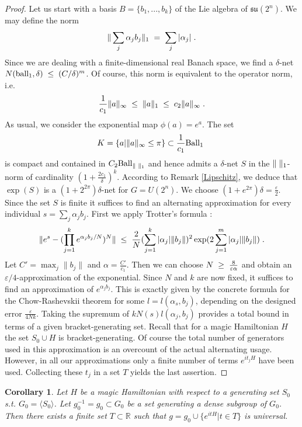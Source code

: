\documentclass[12pt, a4-paper]{amsart}
\numberwithin{equation}{section}
\newcommand{\kl}{\pl \le \pl}
\newcommand{\gl}{\pl \ge \pl}
\newcommand{\lel}{\pl = \pl}
\newcommand{\rz}{{\mathbb R}}
\newcommand{\pl}{\hspace{.1cm}}
\newcommand{\al}{\alpha}
\newcommand{\eps}{\varepsilon}
\newtheorem{cor}[lemma]{Corollary}
\begin{document}
\begin{proof} Let us start with a basis $B=\{b_1,...,b_k\}$ of the Lie algebra of $\mathfrak{su}(2^n)$. We may define the norm 
 \[ \|\sum_j \al_j b_j\|_1  \lel \sum_j |\al_j|  \pl. \]
Since we are dealing with a finite-dimensional real Banach space, we find a $\delta$-net $N({\rm ball}_1,\delta)\kl (C/\delta)^{m}$. Of course, this norm is equivalent to the operator norm, i.e. 
  \[ \frac{1}{c_1} \|a\|_{\infty} \kl \|a\|_1 \kl c_2 \|a\|_{\infty} \pl .\]
As usual, we consider the exponential map $\phi(a)=e^{a}$. The set 
\[ K=\{a| \|a\|_{\infty}\le \pi\}\subset \frac{1}{c_1}{\rm Ball}_1\pl\]
is compact and contained in $C_2{\rm Ball}_{\|\pl\|_1}$ and hence admits a $\delta$-net $S$ in the $\|\pl\|_1$-norm of cardinality $(1+\frac{2c_1}{\delta})^{k}$. According to  Remark  \ref{Lipschitz}, we deduce that $\exp(S)$ is a $(1+2^{2\pi})\delta$-net for $G=U(2^n)$. We choose $(1+e^{2\pi})\delta=\frac{\eps}{2}$. Since the set $S$ is finite it suffices to find an alternating approximation for every individual $s=\sum_j \al_j b_j$. First we apply Trotter's formula \cite{Suzuki1976}:
 \[ \|e^s-(\prod_{j=1}^k e^{\al_j b_j/N})^N\| \kl \frac{2}{N} (\sum_{j=1}^k |\al_j| \|b_j\|)^2 \exp(2 \sum_{j=1}^m |\al_j| \|b_j\|) \pl .\]
Let $C'=\max_j\|b_j\|$ and $\al=\frac{C'}{c_1}$. Then we can choose $N\gl \frac{8}{\eps \al}$ and obtain an $\eps/4$-approximation of  the exponential. Since $N$ and $k$ are now fixed, it suffices to find an approximation of $e^{\al_j b_j}$. This is exactly given by the concrete formula for the Chow-Rashevskii theorem \cite{Giannotti2024ProvingRashevskii} for some $l=l(\al_s,b_j)$, depending on the designed error $\frac{\eps}{4Nk}$. Taking the supremum of $kN(s)l(\al_j,b_j)$ provides a total bound in terms of a given bracket-generating set. 
Recall that for a magic Hamiltonian $H$ the set $S_0\cup H$ is bracket-generating. Of course the total number of generators used in this approximation is an overcount of the actual alternating usage. However, in all our approximations only a finite number of terms $e^{it_jH}$ have been used. Collecting these $t_j$ in a set $T$ yields the last assertion. \end{proof}
 
\begin{cor} Let $H$ be a magic Hamiltonian with respect to a generating set $S_0$ s.t. $G_0 = \langle S_0 \rangle$.
Let $g_0^{-1}=g_0\subset G_0$ be a set generating a dense subgroup of $G_0$. Then there exists a finite set $T\subset \rz$ such that
$g=g_0\cup \{e^{itH}|t\in T\}$ is universal.
\end{cor}
\end{document}

